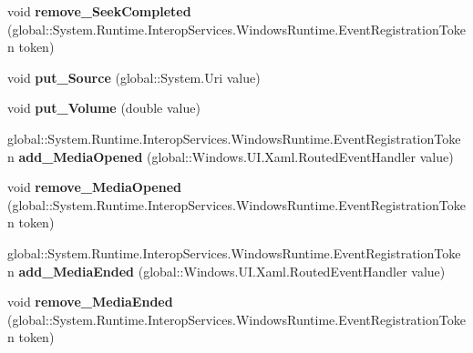 \begin{DoxyCompactItemize}
void {\bfseries remove\+\_\+\+Seek\+Completed} (global\+::\+System.\+Runtime.\+Interop\+Services.\+Windows\+Runtime.\+Event\+Registration\+Token token)
\item 
\mbox{\label{interface_windows_1_1_u_i_1_1_xaml_1_1_controls_1_1_i_media_element_a9ccfe5f23b86ca54424f89ee8816be21}} 
void {\bfseries put\+\_\+\+Source} (global\+::\+System.\+Uri value)
\item 
\mbox{\label{interface_windows_1_1_u_i_1_1_xaml_1_1_controls_1_1_i_media_element_a499a56726198bd3a2e13da7fdaea8eb4}} 
void {\bfseries put\+\_\+\+Volume} (double value)
\item 
\mbox{\label{interface_windows_1_1_u_i_1_1_xaml_1_1_controls_1_1_i_media_element_af710ba32e5c086d5646e1a61e3a2bbaf}} 
global\+::\+System.\+Runtime.\+Interop\+Services.\+Windows\+Runtime.\+Event\+Registration\+Token {\bfseries add\+\_\+\+Media\+Opened} (global\+::\+Windows.\+U\+I.\+Xaml.\+Routed\+Event\+Handler value)
\item 
\mbox{\label{interface_windows_1_1_u_i_1_1_xaml_1_1_controls_1_1_i_media_element_ab974c092f3afe5c2c6eb21871e35d724}} 
void {\bfseries remove\+\_\+\+Media\+Opened} (global\+::\+System.\+Runtime.\+Interop\+Services.\+Windows\+Runtime.\+Event\+Registration\+Token token)
\item 
\mbox{\label{interface_windows_1_1_u_i_1_1_xaml_1_1_controls_1_1_i_media_element_a190c35f36005ac4360bc442c58c24107}} 
global\+::\+System.\+Runtime.\+Interop\+Services.\+Windows\+Runtime.\+Event\+Registration\+Token {\bfseries add\+\_\+\+Media\+Ended} (global\+::\+Windows.\+U\+I.\+Xaml.\+Routed\+Event\+Handler value)
\item 
\mbox{\label{interface_windows_1_1_u_i_1_1_xaml_1_1_controls_1_1_i_media_element_ae99093952bc4b7f856129d782cea9237}} 
void {\bfseries remove\+\_\+\+Media\+Ended} (global\+::\+System.\+Runtime.\+Interop\+Services.\+Windows\+Runtime.\+Event\+Registration\+Token token)

\end{DoxyCompactItemize}
